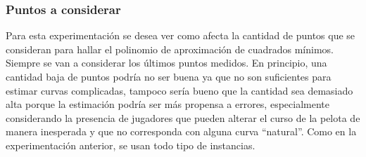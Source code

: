 \subsubsection{Puntos a considerar}
Para esta experimentación se desea ver como afecta la cantidad de puntos que se consideran para hallar el polinomio de aproximación de 
cuadrados mínimos. Siempre se van a considerar los últimos puntos medidos. En principio, una cantidad baja de puntos podría no ser 
buena ya que no son suficientes para estimar curvas complicadas, tampoco sería bueno que la cantidad sea demasiado alta porque la 
estimación podría ser más propensa a errores, especialmente considerando la presencia de jugadores que pueden alterar el curso de la 
pelota de manera inesperada y que no corresponda con alguna curva ``natural''. Como en la experimentación anterior, se usan todo tipo 
de instancias.





